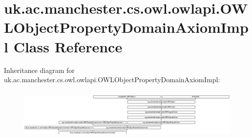 \hypertarget{classuk_1_1ac_1_1manchester_1_1cs_1_1owl_1_1owlapi_1_1_o_w_l_object_property_domain_axiom_impl}{\section{uk.\-ac.\-manchester.\-cs.\-owl.\-owlapi.\-O\-W\-L\-Object\-Property\-Domain\-Axiom\-Impl Class Reference}
\label{classuk_1_1ac_1_1manchester_1_1cs_1_1owl_1_1owlapi_1_1_o_w_l_object_property_domain_axiom_impl}
}
Inheritance diagram for uk.\-ac.\-manchester.\-cs.\-owl.\-owlapi.\-O\-W\-L\-Object\-Property\-Domain\-Axiom\-Impl\-:\begin{figure}[H]
\begin{center}
\leavevmode
\includegraphics[height=2.526791cm]{classuk_1_1ac_1_1manchester_1_1cs_1_1owl_1_1owlapi_1_1_o_w_l_object_property_domain_axiom_impl}
\end{center}
\end{figure}
